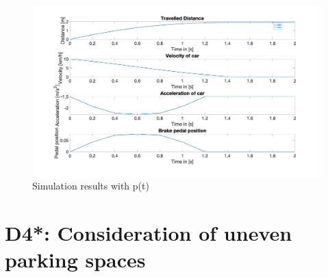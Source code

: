 \begin{figure}[H]
\centering
\includegraphics[width=1\textwidth]{images/D3_pt.jpg}
\caption{Simulation results with p(t)}
\label{fig:D3_pt}
\end{figure}

\chapter{D4*: Consideration of uneven parking spaces}\label{cha:D4}

